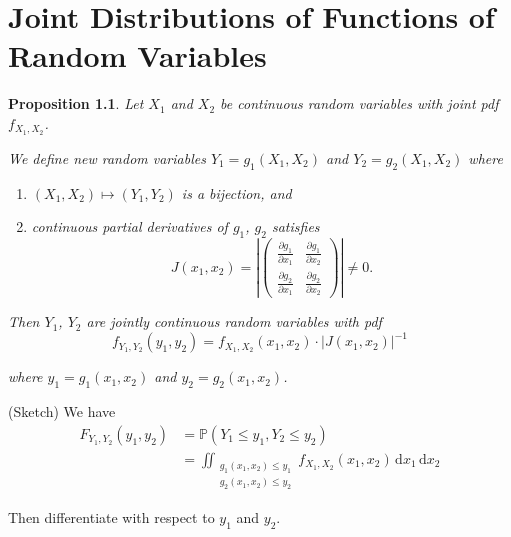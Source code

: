 \documentclass[a4paper,11pt]{amsbook}
\makeatletter
\renewenvironment{proof}[1][\proofname]{\par
    \pushQED{\qed}%
    \normalfont \topsep6\p@\@plus6\p@\relax
    \trivlist
    \itemindent\z@ %
    \item[\hskip\labelsep
          \scshape
      #1\@addpunct{.}]\ignorespaces
}{%
    \popQED\endtrivlist\@endpefalse
}
\newtheorem{proposition}{\hspace{-2em} \color{darkblue} Proposition}[chapter]
\theoremstyle{definition}
\theoremstyle{remark}
\renewcommand{\P}{\mathbb{P}}
\newcommand{\abs}[1]{\left|#1\right|}
\newcommand\0{\varnothing}
\newcommand\dt[1][t]{\,\mathrm{d}#1}
\newcommand\pdiff[2][]
{
    \frac{\partial#1}{\partial#2}
}
\makeatother
\begin{document}
\chapter{Joint Distributions of Functions of Random Variables}
    \begin{proposition} \label{joint-distribution}
        Let $X_1$ and $X_2$ be continuous random variables with joint pdf $f_{X_1,X_2}$.

        We define new random variables $Y_1=g_1(X_1,X_2)$ and $Y_2=g_2(X_1,X_2)$ where 
        \begin{enumerate}
            \item $(X_1,X_2)\mapsto(Y_1,Y_2)$ is a bijection, and
            \item continuous partial derivatives of $g_1$, $g_2$ satisfies $$J(x_1,x_2)=\abs{\begin{pmatrix}
                \pdiff[g_1]{x_1} & \pdiff[g_1]{x_2} \\[5pt]
                \pdiff[g_2]{x_1} & \pdiff[g_2]{x_2}
            \end{pmatrix}}\neq0.$$
        \end{enumerate}

        Then $Y_1$, $Y_2$ are jointly continuous random variables with pdf
        $$f_{Y_1,Y_2}(y_1,y_2)=f_{X_1,X_2}(x_1,x_2)\cdot\abs{J(x_1,x_2)}^{-1}$$

        where $y_1=g_1(x_1,x_2)$ and $y_2=g_2(x_1,x_2)$.
    \end{proposition}
    \begin{proof}
        (Sketch) We have \begin{align*}
            F_{Y_1,Y_2}(y_1,y_2)&=\P(Y_1\leq y_1,Y_2\leq y_2) \\
            &=\iint_{\substack{g_1(x_1,x_2)\leq y_1 \\ g_2(x_1,x_2)\leq y_2}}f_{X_1,X_2}(x_1,x_2)\dt[x_1]\dt[x_2] 
        \end{align*}

        Then differentiate with respect to $y_1$ and $y_2$.
    \end{proof}
\end{document}
